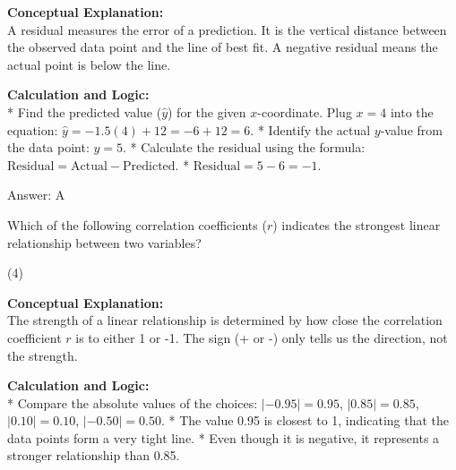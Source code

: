 \documentclass[11pt,paper=a4,answers]{exam}
\begin{document}
\begin{questions}
\begin{solution}
\textbf{Conceptual Explanation:} \\
A residual measures the error of a prediction. It is the vertical distance between the observed data point and the line of best fit. A negative residual means the actual point is below the line.

\vspace{30pt}

\textbf{Calculation and Logic:} \\
* Find the predicted value ($\hat{y}$) for the given $x$-coordinate. Plug $x = 4$ into the equation:
  $\hat{y} = -1.5(4) + 12 = -6 + 12 = 6$.
* Identify the actual $y$-value from the data point: $y = 5$.
* Calculate the residual using the formula: $\text{Residual} = \text{Actual} - \text{Predicted}$.
* $\text{Residual} = 5 - 6 = -1$.

\vspace{30pt}

Answer: \colorbox{yellow!100}{A}
\end{solution}

\vspace{60pt}

\question
Which of the following correlation coefficients ($r$) indicates the strongest linear relationship between two variables?
\begin{tasks}(4)
\end{tasks}

\begin{solution}
\textbf{Conceptual Explanation:} \\
The strength of a linear relationship is determined by how close the correlation coefficient $r$ is to either 1 or -1. The sign (+ or -) only tells us the direction, not the strength.

\vspace{30pt}

\textbf{Calculation and Logic:} \\
* Compare the absolute values of the choices:
  $|-0.95| = 0.95$, $|0.85| = 0.85$, $|0.10| = 0.10$, $|-0.50| = 0.50$.
* The value 0.95 is closest to 1, indicating that the data points form a very tight line.
* Even though it is negative, it represents a stronger relationship than 0.85.

\vspace{30pt}


\end{solution}
\end{questions}
\end{document}
